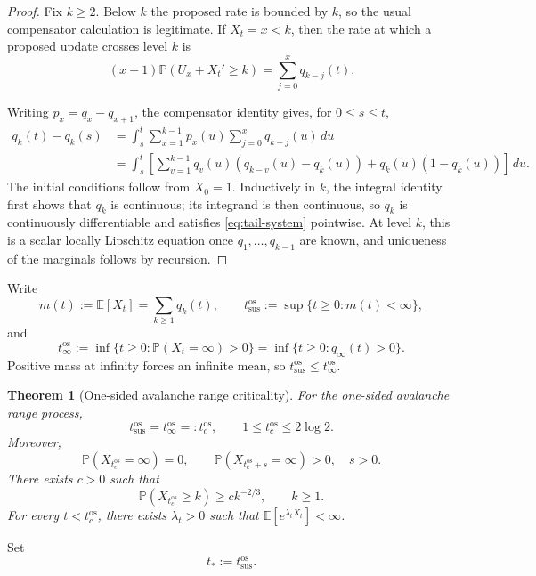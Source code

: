 \documentclass[11pt,a4paper]{amsart}
\newtheorem{theorem}{Theorem}[section]
\theoremstyle{remark}
\begin{document}
\begin{proof}
Fix $k\geq2$. Below $k$ the proposed rate is bounded by $k$, so the usual compensator calculation is legitimate. If $X_t=x<k$, then the rate at which a proposed update crosses level $k$ is
\[
        (x+1)\mathbb{P}(U_x+X_t'\geq k)
        =\sum_{j=0}^x q_{k-j}(t).
\]

Writing $p_x=q_x-q_{x+1}$, the compensator identity gives, for
$0\leq s\leq t$,
\[
\begin{split}
        q_k(t)-q_k(s)
        &=\int_s^t\sum_{x=1}^{k-1}p_x(u)
          \sum_{j=0}^xq_{k-j}(u)\,du\\
        &=\int_s^t\left[
          \sum_{v=1}^{k-1}q_v(u)(q_{k-v}(u)-q_k(u))
          +q_k(u)(1-q_k(u))\right]\,du.
\end{split}
\]
The initial conditions follow from $X_0=1$. Inductively in $k$, the integral
identity first shows that $q_k$ is continuous; its integrand is then
continuous, so $q_k$ is continuously differentiable and satisfies
\eqref{eq:tail-system} pointwise. At level $k$, this is a scalar locally
Lipschitz equation once $q_1,\ldots,q_{k-1}$ are known, and uniqueness of
the marginals follows by recursion.
\end{proof}

Write
\[
        m(t):=\mathbb{E}[X_t]=\sum_{k\geq1}q_k(t),\qquad
        t_{\mathrm{sus}}^{\mathrm{os}}
        :=\sup\{t\geq0:m(t)<\infty\},
\]
and
\[
        t_{\infty}^{\mathrm{os}}
        :=\inf\{t\geq0:\mathbb{P}(X_t=\infty)>0\}
        =\inf\{t\geq0:q_\infty(t)>0\}.
\]
Positive mass at infinity forces an infinite mean, so
$t_{\mathrm{sus}}^{\mathrm{os}}\leq t_{\infty}^{\mathrm{os}}$.

\begin{theorem}[One-sided avalanche range criticality]
\label{thm:range-criticality}
For the one-sided avalanche range process,
\[
        t_{\mathrm{sus}}^{\mathrm{os}}
        =t_{\infty}^{\mathrm{os}}
        =:t_c^{\mathrm{os}},
        \qquad 1\leq t_c^{\mathrm{os}}\leq2\log2.
\]
Moreover,
\[
        \mathbb{P}(X_{t_c^{\mathrm{os}}}=\infty)=0,
        \qquad
        \mathbb{P}(X_{t_c^{\mathrm{os}}+s}=\infty)>0,
        \quad s>0.
\]
There exists \(c>0\) such that
\[
        \mathbb{P}(X_{t_c^{\mathrm{os}}}\geq k)
        \geq ck^{-2/3},
        \qquad k\geq1.
\]
For every \(t<t_c^{\mathrm{os}}\), there exists \(\lambda_t>0\) such that
\(\mathbb{E}[e^{\lambda_tX_t}]<\infty\).
\end{theorem}

Set
\[
        t_*:=t_{\mathrm{sus}}^{\mathrm{os}}.
\]
\end{document}
